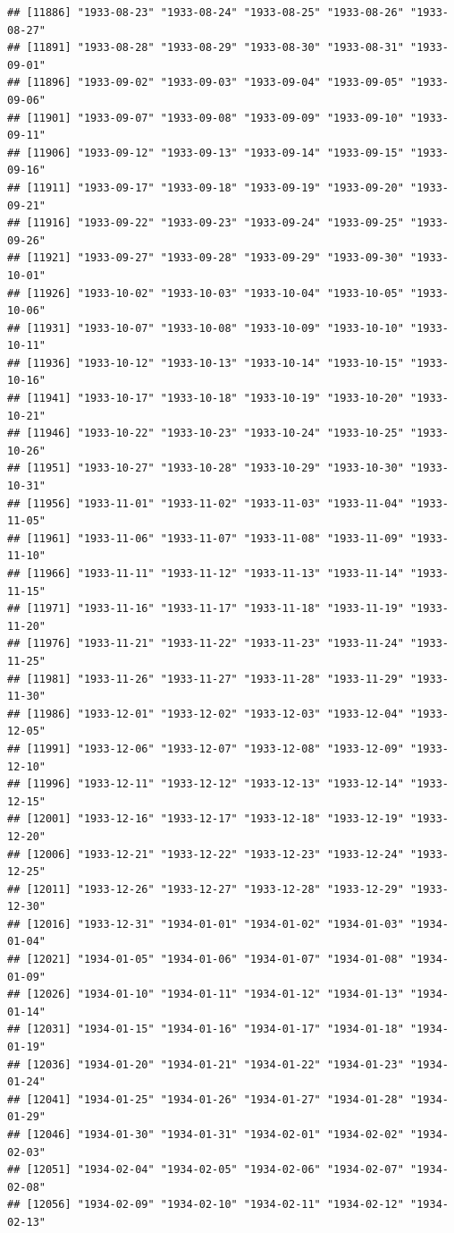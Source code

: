 \documentclass{article}\usepackage[]{graphicx}\usepackage[]{color}
\makeatletter
\newenvironment{kframe}{%
 \def\at@end@of@kframe{}%
 \ifinner\ifhmode%
  \def\at@end@of@kframe{\end{minipage}}%
  \begin{minipage}{\columnwidth}%
 \fi\fi%
 \def\FrameCommand##1{\hskip\@totalleftmargin \hskip-\fboxsep
 \colorbox{shadecolor}{##1}\hskip-\fboxsep
     \hskip-\linewidth \hskip-\@totalleftmargin \hskip\columnwidth}%
 \MakeFramed {\advance\hsize-\width
   \@totalleftmargin\z@ \linewidth\hsize
   \@setminipage}}%
 {\par\unskip\endMakeFramed%
 \at@end@of@kframe}
\newenvironment{knitrout}{}{} %
\makeatother
\begin{document}
\begin{description}
\begin{knitrout}
\begin{kframe}
\begin{verbatim}
## [11886] "1933-08-23" "1933-08-24" "1933-08-25" "1933-08-26" "1933-08-27"
## [11891] "1933-08-28" "1933-08-29" "1933-08-30" "1933-08-31" "1933-09-01"
## [11896] "1933-09-02" "1933-09-03" "1933-09-04" "1933-09-05" "1933-09-06"
## [11901] "1933-09-07" "1933-09-08" "1933-09-09" "1933-09-10" "1933-09-11"
## [11906] "1933-09-12" "1933-09-13" "1933-09-14" "1933-09-15" "1933-09-16"
## [11911] "1933-09-17" "1933-09-18" "1933-09-19" "1933-09-20" "1933-09-21"
## [11916] "1933-09-22" "1933-09-23" "1933-09-24" "1933-09-25" "1933-09-26"
## [11921] "1933-09-27" "1933-09-28" "1933-09-29" "1933-09-30" "1933-10-01"
## [11926] "1933-10-02" "1933-10-03" "1933-10-04" "1933-10-05" "1933-10-06"
## [11931] "1933-10-07" "1933-10-08" "1933-10-09" "1933-10-10" "1933-10-11"
## [11936] "1933-10-12" "1933-10-13" "1933-10-14" "1933-10-15" "1933-10-16"
## [11941] "1933-10-17" "1933-10-18" "1933-10-19" "1933-10-20" "1933-10-21"
## [11946] "1933-10-22" "1933-10-23" "1933-10-24" "1933-10-25" "1933-10-26"
## [11951] "1933-10-27" "1933-10-28" "1933-10-29" "1933-10-30" "1933-10-31"
## [11956] "1933-11-01" "1933-11-02" "1933-11-03" "1933-11-04" "1933-11-05"
## [11961] "1933-11-06" "1933-11-07" "1933-11-08" "1933-11-09" "1933-11-10"
## [11966] "1933-11-11" "1933-11-12" "1933-11-13" "1933-11-14" "1933-11-15"
## [11971] "1933-11-16" "1933-11-17" "1933-11-18" "1933-11-19" "1933-11-20"
## [11976] "1933-11-21" "1933-11-22" "1933-11-23" "1933-11-24" "1933-11-25"
## [11981] "1933-11-26" "1933-11-27" "1933-11-28" "1933-11-29" "1933-11-30"
## [11986] "1933-12-01" "1933-12-02" "1933-12-03" "1933-12-04" "1933-12-05"
## [11991] "1933-12-06" "1933-12-07" "1933-12-08" "1933-12-09" "1933-12-10"
## [11996] "1933-12-11" "1933-12-12" "1933-12-13" "1933-12-14" "1933-12-15"
## [12001] "1933-12-16" "1933-12-17" "1933-12-18" "1933-12-19" "1933-12-20"
## [12006] "1933-12-21" "1933-12-22" "1933-12-23" "1933-12-24" "1933-12-25"
## [12011] "1933-12-26" "1933-12-27" "1933-12-28" "1933-12-29" "1933-12-30"
## [12016] "1933-12-31" "1934-01-01" "1934-01-02" "1934-01-03" "1934-01-04"
## [12021] "1934-01-05" "1934-01-06" "1934-01-07" "1934-01-08" "1934-01-09"
## [12026] "1934-01-10" "1934-01-11" "1934-01-12" "1934-01-13" "1934-01-14"
## [12031] "1934-01-15" "1934-01-16" "1934-01-17" "1934-01-18" "1934-01-19"
## [12036] "1934-01-20" "1934-01-21" "1934-01-22" "1934-01-23" "1934-01-24"
## [12041] "1934-01-25" "1934-01-26" "1934-01-27" "1934-01-28" "1934-01-29"
## [12046] "1934-01-30" "1934-01-31" "1934-02-01" "1934-02-02" "1934-02-03"
## [12051] "1934-02-04" "1934-02-05" "1934-02-06" "1934-02-07" "1934-02-08"
## [12056] "1934-02-09" "1934-02-10" "1934-02-11" "1934-02-12" "1934-02-13"

\end{verbatim}
\end{kframe}
\end{knitrout}
\end{description}
\end{document}
